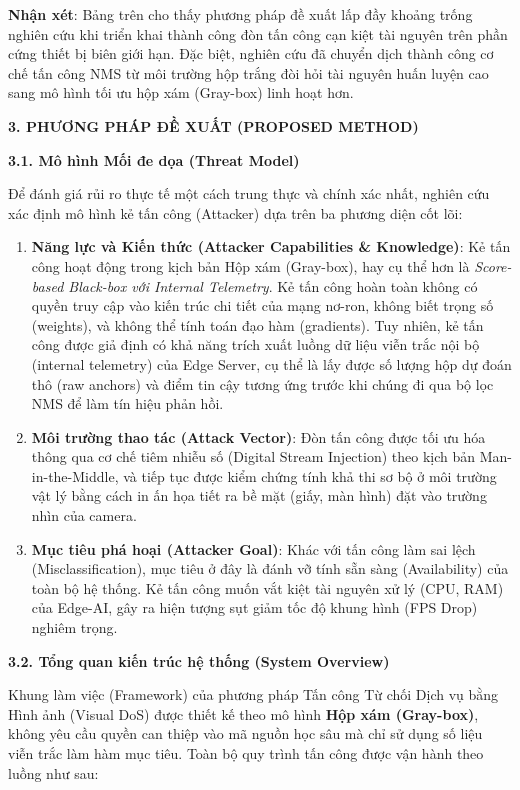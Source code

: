 \textbf{Nhận xét}: Bảng trên cho thấy phương pháp đề xuất lấp đầy khoảng
trống nghiên cứu khi triển khai thành công đòn tấn công cạn kiệt tài
nguyên trên phần cứng thiết bị biên giới hạn. Đặc biệt, nghiên cứu đã
chuyển dịch thành công cơ chế tấn công NMS từ môi trường hộp trắng đòi
hỏi tài nguyên huấn luyện cao sang mô hình tối ưu hộp xám (Gray-box)
linh hoạt hơn.\textbf{\hfill\break
}

\textbf{3. PHƯƠNG PHÁP ĐỀ XUẤT (PROPOSED METHOD)}

\textbf{3.1. Mô hình Mối đe dọa (Threat Model)}

Để đánh giá rủi ro thực tế một cách trung thực và chính xác nhất, nghiên
cứu xác định mô hình kẻ tấn công (Attacker) dựa trên ba phương diện cốt
lõi:

\begin{enumerate}
\def\labelenumi{\arabic{enumi}.}
\item
  \textbf{Năng lực và Kiến thức (Attacker Capabilities \& Knowledge)}:
  Kẻ tấn công hoạt động trong kịch bản Hộp xám (Gray-box), hay cụ thể
  hơn là \emph{Score-based Black-box với Internal Telemetry}. Kẻ tấn
  công hoàn toàn không có quyền truy cập vào kiến trúc chi tiết của mạng
  nơ-ron, không biết trọng số (weights), và không thể tính toán đạo hàm
  (gradients). Tuy nhiên, kẻ tấn công được giả định có khả năng trích
  xuất luồng dữ liệu viễn trắc nội bộ (internal telemetry) của Edge
  Server, cụ thể là lấy được số lượng hộp dự đoán thô (raw anchors) và
  điểm tin cậy tương ứng trước khi chúng đi qua bộ lọc NMS để làm tín
  hiệu phản hồi.
\item
  \textbf{Môi trường thao tác (Attack Vector)}: Đòn tấn công được tối ưu
  hóa thông qua cơ chế tiêm nhiễu số (Digital Stream Injection) theo
  kịch bản Man-in-the-Middle, và tiếp tục được kiểm chứng tính khả thi
  sơ bộ ở môi trường vật lý bằng cách in ấn họa tiết ra bề mặt (giấy,
  màn hình) đặt vào trường nhìn của camera.
\item
  \textbf{Mục tiêu phá hoại (Attacker Goal)}: Khác với tấn công làm sai
  lệch (Misclassification), mục tiêu ở đây là đánh vỡ tính sẵn sàng
  (Availability) của toàn bộ hệ thống. Kẻ tấn công muốn vắt kiệt tài
  nguyên xử lý (CPU, RAM) của Edge-AI, gây ra hiện tượng sụt giảm tốc độ
  khung hình (FPS Drop) nghiêm trọng.
\end{enumerate}

\textbf{3.2. Tổng quan kiến trúc hệ thống (System Overview)}

Khung làm việc (Framework) của phương pháp Tấn công Từ chối Dịch vụ bằng
Hình ảnh (Visual DoS) được thiết kế theo mô hình \textbf{Hộp xám
(Gray-box)}, không yêu cầu quyền can thiệp vào mã nguồn học sâu mà chỉ
sử dụng số liệu viễn trắc làm hàm mục tiêu. Toàn bộ quy trình tấn công
được vận hành theo luồng như sau:

